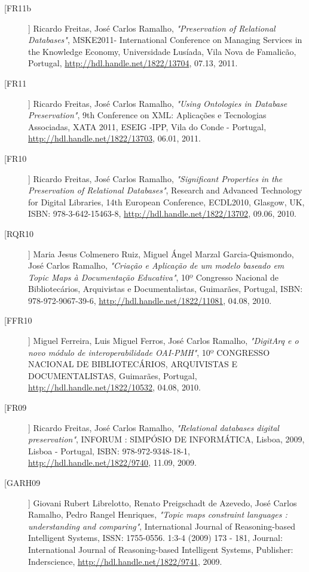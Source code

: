 \begin{description}
\item[[FR11b]]
    \textsf{Ricardo Freitas, José Carlos Ramalho}, \emph{"Preservation of Relational Databases"}, MSKE2011- International Conference on Managing Services in the Knowledge Economy, Universidade Lusíada, Vila Nova de Famalicão, Portugal, \url{http://hdl.handle.net/1822/13704}, 07.13, 2011.

\item[[FR11]]
    \textsf{Ricardo Freitas, José Carlos Ramalho}, \emph{"Using Ontologies in Database Preservation"}, 9th Conference on XML: Aplicações e Tecnologias Associadas, XATA 2011, ESEIG -IPP, Vila do Conde - Portugal, \url{http://hdl.handle.net/1822/13703}, 06.01, 2011.

\item[[FR10]]
    \textsf{Ricardo Freitas, José Carlos Ramalho}, \emph{"Significant Properties in the Preservation of Relational Databases"}, Research and Advanced Technology for Digital Libraries, 14th European Conference, ECDL2010, Glasgow, UK, ISBN: 978-3-642-15463-8, \url{http://hdl.handle.net/1822/13702}, 09.06, 2010.

\item[[RQR10]]
    \textsf{Maria Jesus Colmenero Ruiz, Miguel Ángel Marzal Garcia-Quismondo, José Carlos Ramalho}, \emph{"Criação e Aplicação de um modelo baseado em Topic Maps à Documentação Educativa"}, 10º Congresso Nacional de Bibliotecários, Arquivistas e Documentalistas, Guimarães, Portugal, ISBN: 978-972-9067-39-6, \url{http://hdl.handle.net/1822/11081}, 04.08, 2010.

\item[[FFR10]]
    \textsf{Miguel Ferreira, Luis Miguel Ferros, José Carlos Ramalho}, \emph{"DigitArq e o novo módulo de interoperabilidade OAI-PMH"}, 10º CONGRESSO NACIONAL DE BIBLIOTECÁRIOS, ARQUIVISTAS E DOCUMENTALISTAS, Guimarães, Portugal, \url{http://hdl.handle.net/1822/10532}, 04.08, 2010.

\item[[FR09]]
    \textsf{Ricardo Freitas, José Carlos Ramalho}, \emph{"Relational databases digital preservation"}, INFORUM : SIMPÓSIO DE INFORMÁTICA, Lisboa, 2009, Lisboa - Portugal, ISBN: 978-972-9348-18-1, \url{http://hdl.handle.net/1822/9740}, 11.09, 2009.

\item[[GARH09]]
    \textsf{Giovani Rubert Librelotto, Renato Preigschadt de Azevedo, José Carlos Ramalho, Pedro Rangel Henriques}, \emph{"Topic maps constraint languages : understanding and comparing"}, International Journal of Reasoning-based Intelligent Systems, ISSN: 1755-0556. 1:3-4 (2009) 173 - 181, Journal: International Journal of Reasoning-based Intelligent Systems, Publisher: Inderscience, \url{http://hdl.handle.net/1822/9741}, 2009.


\end{description}
